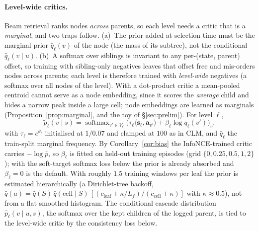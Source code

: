 \paragraph{Level-wide critics.}
Beam retrieval ranks nodes \emph{across} parents, so each level needs a critic that is a \emph{marginal}, and two traps follow. (a)~The prior added at selection time must be the marginal prior $\bar q_\ell(v)$ of the node (the mass of its subtree), not the conditional $\hat q_\ell(v\mid u)$. (b)~A softmax over siblings is invariant to any per-(state, parent) offset, so training with sibling-only negatives leaves that offset free and mis-orders nodes across parents; each level is therefore trained with \emph{level-wide} negatives (a softmax over all nodes of the level). With a dot-product critic a mean-pooled centroid cannot serve as a node embedding, since it scores the \emph{average} child and hides a narrow peak inside a large cell; node embeddings are learned as marginals (Proposition~\ref{prop:marginal}, and the toy of \S\ref{sec:prelim}).
For level $\ell$,
\begin{equation}
\tilde p_\ell(v\mid s)=\operatorname{softmax}_{v'\in V_\ell}\Big(\tau_\ell\langle\mathbf s_\ell,\mathbf a_{v'}\rangle+\beta_\ell\log\bar q_\ell(v')\Big)_v,
\end{equation}
with $\tau_\ell=e^{\theta_\ell}$ initialised at $1/0.07$ and clamped at $100$ as in CLM, and $\bar q_\ell$ the train-split marginal frequency. By Corollary~\ref{cor:bias} the InfoNCE-trained critic carries $-\log\bar p$, so $\beta_\ell$ is fitted on held-out training episodes (grid $\{0,0.25,0.5,1,2\}$); with the soft-target softmax loss below the prior is already absorbed and $\beta_\ell=0$ is the default.
With roughly $1.5$ training windows per leaf the prior is estimated hierarchically (a Dirichlet-tree backoff, $\hat q(a)=\hat q(S)\,\hat q(\text{cell}\mid S)\,[(c_{\text{leaf}}+\kappa/L_f)/(c_{\text{cell}}+\kappa)]$ with $\kappa\approx0.5$), not from a flat smoothed histogram. The conditional cascade distribution $\hat p_\ell(v\mid u,s)$, the softmax over the kept children of the logged parent, is tied to the level-wide critic by the consistency loss below.

